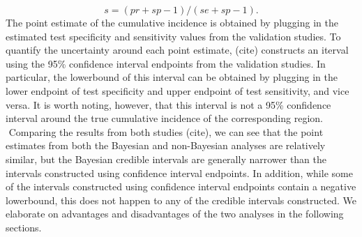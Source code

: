 \[
s = (pr + sp - 1) / (se + sp - 1).
\]
The point estimate of the cumulative incidence is obtained by plugging in the estimated test specificity and sensitivity values from the validation studies. To quantify the uncertainty around each point estimate, (cite) constructs an iterval using the 95\% confidence interval endpoints from the validation studies. In particular, the lowerbound of this interval can be obtained by plugging in the lower endpoint of test specificity and upper endpoint of test sensitivity, and vice versa. It is worth noting, however, that this interval is not a 95\% confidence interval around the true cumulative incidence of the corresponding region.\\
\newline$ $
Comparing the results from both studies (cite), we can see that the point estimates from both the Bayesian and non-Bayesian analyses are relatively similar, but the Bayesian credible intervals are generally narrower than the intervals constructed using confidence interval endpoints. In addition, while some of the intervals constructed using confidence interval endpoints contain a negative lowerbound, this does not happen to any of the credible intervals constructed. We elaborate on advantages and disadvantages of the two analyses in the following sections.